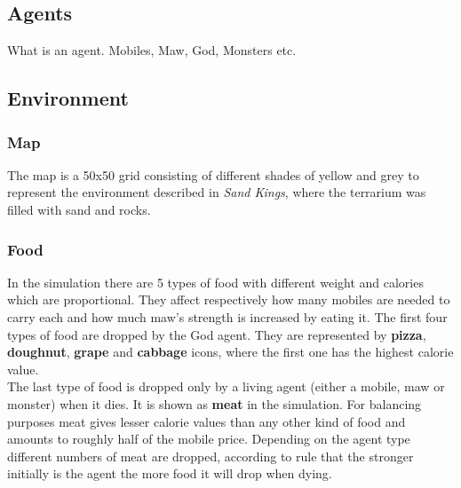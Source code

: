 \documentclass[conference]{IEEEtran}
\begin{document}
\subsection{Agents}
What is an agent. Mobiles, Maw, God, Monsters etc.



\subsection{Environment}
\subsubsection{Map}

The map is a 50x50 grid consisting of different shades of yellow and grey to represent the environment described in \textit{Sand Kings}, where the terrarium was filled with sand and rocks.
\\
\subsubsection{Food}

In the simulation there are 5 types of food with different weight and calories which are proportional. They affect respectively how many mobiles are needed to carry each and how much maw's strength is increased by eating it.
The first four types of food are dropped by the God agent. They are represented by \textbf{pizza}, \textbf{doughnut}, \textbf{grape} and \textbf{cabbage} icons, where the first one has the highest calorie value.
\\
The last type of food is dropped only by a living agent (either a mobile, maw or monster) when it dies. It is shown as \textbf{meat} in the simulation. For balancing purposes meat gives lesser calorie values than any other kind of food and amounts to roughly half of the mobile price. Depending on the agent type different numbers of meat are dropped, according to rule that the stronger initially is the agent the more food it will drop when dying.












\end{document}
